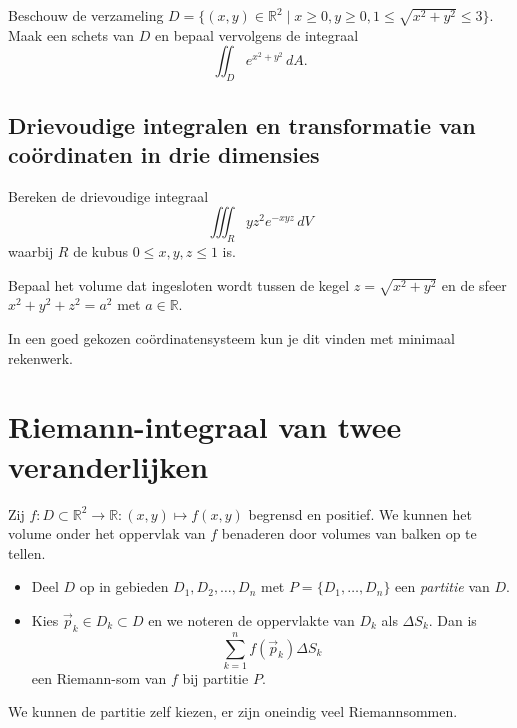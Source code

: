 \documentclass[
    10pt,
    a4paper,
    twoside,
]{article}
\begin{document}
\begin{oefening}{}{}
    Beschouw de verzameling $D = \{(x,y) \in \mathbb{R}^2 \mid x \geq 0, y \geq 0, 1 \leq \sqrt{x^2 + y^2} \leq 3\}$.
    Maak een schets van $D$ en bepaal vervolgens de integraal
    \[
        \iint_D e^{x^2+y^2}\, dA.
    \]
\end{oefening}


\subsection*{Drievoudige integralen en transformatie van coördinaten in drie dimensies}
\begin{oefening}{}{}
    Bereken de drievoudige integraal
    \[
        \iiint_R yz^2 e^{-xyz}\, dV
    \] waarbij $R$ de kubus $0 \leq x, y, z \leq 1$ is.
\end{oefening}

\begin{oefening}{}{}
    Bepaal het volume dat ingesloten wordt tussen de kegel $z = \sqrt{x^2 + y^2}$ en de sfeer $x^2 + y^2 + z^2 = a^2$ met $a \in \mathbb{R}$.
    \begin{hint}{}
        In een goed gekozen coördinatensysteem kun je dit vinden met minimaal rekenwerk.
    \end{hint}
\end{oefening}


\section{Riemann-integraal van twee veranderlijken}

Zij $\displaystyle f\colon D \subset \mathbb{R}^2 \to \mathbb{R}\colon (x,y) \mapsto f(x,y)$ begrensd en positief.
We kunnen het volume onder het oppervlak van $f$ benaderen door volumes van balken op te tellen.
\begin{itemize}
    \item Deel $D$ op in gebieden $D_1, D_2, \ldots, D_n$ met $P = \{D_1, \ldots, D_n\}$ een \emph{partitie} van $D$.
    \item Kies $\vec{p}_k \in D_k \subset D$ en we noteren de oppervlakte van $D_k$ als $\Delta S_k$.
        Dan is \[
            \sum_{k=1}^{n} f(\vec{p}_k)\Delta S_k
        \] een Riemann-som van $f$ bij partitie $P$.
\end{itemize}
\begin{opmerking}{}
    We kunnen de partitie zelf kiezen, er zijn oneindig veel Riemannsommen.
\end{opmerking}
\end{document}
